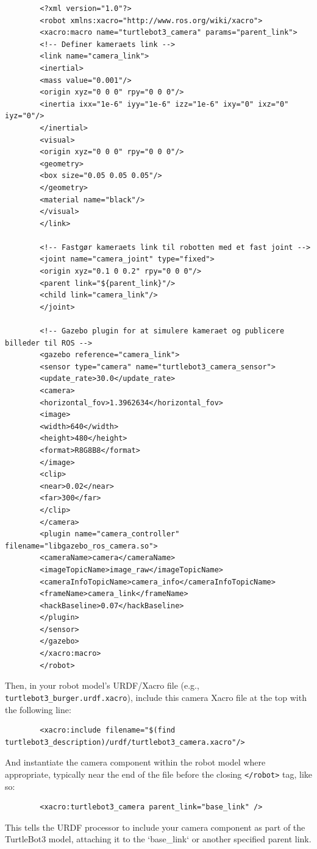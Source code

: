 \documentclass[12pt,a4paper]{article}
\begin{document}
	\begin{verbatim}
		<?xml version="1.0"?>
		<robot xmlns:xacro="http://www.ros.org/wiki/xacro">
		<xacro:macro name="turtlebot3_camera" params="parent_link">
		<!-- Definer kameraets link -->
		<link name="camera_link">
		<inertial>
		<mass value="0.001"/>
		<origin xyz="0 0 0" rpy="0 0 0"/>
		<inertia ixx="1e-6" iyy="1e-6" izz="1e-6" ixy="0" ixz="0" iyz="0"/>
		</inertial>
		<visual>
		<origin xyz="0 0 0" rpy="0 0 0"/>
		<geometry>
		<box size="0.05 0.05 0.05"/>
		</geometry>
		<material name="black"/>
		</visual>
		</link>
		
		<!-- Fastgør kameraets link til robotten med et fast joint -->
		<joint name="camera_joint" type="fixed">
		<origin xyz="0.1 0 0.2" rpy="0 0 0"/>
		<parent link="${parent_link}"/>
		<child link="camera_link"/>
		</joint>
		
		<!-- Gazebo plugin for at simulere kameraet og publicere billeder til ROS -->
		<gazebo reference="camera_link">
		<sensor type="camera" name="turtlebot3_camera_sensor">
		<update_rate>30.0</update_rate>
		<camera>
		<horizontal_fov>1.3962634</horizontal_fov>
		<image>
		<width>640</width>
		<height>480</height>
		<format>R8G8B8</format>
		</image>
		<clip>
		<near>0.02</near>
		<far>300</far>
		</clip>
		</camera>
		<plugin name="camera_controller" filename="libgazebo_ros_camera.so">
		<cameraName>camera</cameraName>
		<imageTopicName>image_raw</imageTopicName>
		<cameraInfoTopicName>camera_info</cameraInfoTopicName>
		<frameName>camera_link</frameName>
		<hackBaseline>0.07</hackBaseline>
		</plugin>
		</sensor>
		</gazebo>
		</xacro:macro>
		</robot>
	\end{verbatim}
	Then, in your robot model's URDF/Xacro file (e.g., \texttt{turtlebot3\_burger.urdf.xacro}), include this camera Xacro file at the top with the following line:
	
	\begin{verbatim}
		<xacro:include filename="$(find turtlebot3_description)/urdf/turtlebot3_camera.xacro"/>
	\end{verbatim}
	And instantiate the camera component within the robot model where appropriate, typically near the end of the file before the closing \texttt{</robot>} tag, like so:
	
	\begin{verbatim}
		<xacro:turtlebot3_camera parent_link="base_link" />
	\end{verbatim}
	This tells the URDF processor to include your camera component as part of the TurtleBot3 model, attaching it to the `base\_link` or another specified parent link.
	
\end{document}
